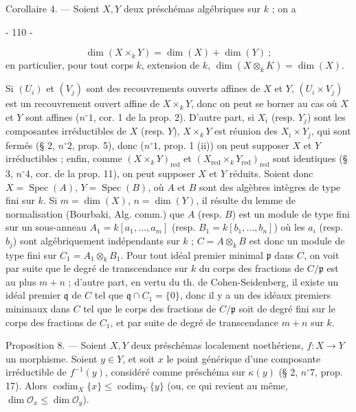 Corollaire 4. — Soient $X, Y$ deux préschémas algébriques sur $k$ ; on a

\newpage


- 110 -

$$\dim(X \times_k Y) = \dim(X) + \dim(Y) \ ;$$
en particulier, pour tout corps $k$, extension de $k$, $\dim(X \otimes_k K) = \dim(X)$.

Si $(U_i)$ et $(V_j)$ sont des recouvrements ouverts affines de $X$ et $Y$, $(U_i \times V_j)$ est un recouvrement ouvert affine de $X \times_k Y$, donc on peut se borner au cas où $X$ et $Y$ sont affines ($n^\circ 1$, cor. 1 de la prop. 2). D'autre part, si $X_i$ (resp. $Y_j$) sont les composantes irréductibles de $X$ (resp. $Y$), $X \times_k Y$ est réunion des $X_i \times Y_j$, qui sont fermés (§ 2, $n^\circ 2$, prop. 5), donc ($n^\circ 1$, prop. 1 (ii)) on peut supposer $X$ et $Y$ irréductibles ; enfin, comme $(X \times_k Y)_{\text{red}}$ et $(X_{\text{red}} \times_k Y_{\text{red}})_{\text{red}}$ sont identiques (§ 3, $n^\circ 4$, cor. de la prop. 11), on peut supposer $X$ et $Y$ réduits. Soient donc $X = \operatorname{Spec}(A)$, $Y = \operatorname{Spec}(B)$, où $A$ et $B$ sont des algèbres intègres de type fini sur $k$. Si $m = \dim(X)$, $n = \dim(Y)$, il résulte du lemme de normalisation (Bourbaki, Alg. comm.) que $A$ (resp. $B$) est un module de type fini sur un sous-anneau $A_1 = k[a_1, \dots, a_m]$ (resp. $B_1 = k[b_1, \dots, b_n]$) où les $a_i$ (resp. $b_j$) sont algébriquement indépendants sur $k$ ; $C = A \otimes_k B$ est donc un module de type fini sur $C_1 = A_1 \otimes_k B_1$. Pour tout idéal premier minimal $\mathfrak{p}$ dans $C$, on voit par suite que le degré de transcendance sur $k$ du corps des fractions de $C/\mathfrak{p}$ est au plus $m+n$ ; d'autre part, en vertu du th. de Cohen-Seidenberg, il existe un idéal premier $\mathfrak{q}$ de $C$ tel que $\mathfrak{q} \cap C_1 = \{0\}$, donc il y a un des idéaux premiers minimaux dans $C$ tel que le corps des fractions de $C/\mathfrak{p}$ soit de degré fini sur le corps des fractions de $C_1$, et par suite de degré de transcendance $m+n$ sur $k$.

Proposition 8. — Soient $X, Y$ deux préschémas localement noethériens, $f: X \to Y$ un morphisme. Soient $y \in Y$, et soit $x$ le point générique d'une composante irréductible de $f^{-1}(y)$, considéré comme préschéma sur $\kappa(y)$ (§ 2, $n^\circ 7$, prop. 17). Alors $\operatorname{codim}_X \{x\} \leqslant \operatorname{codim}_Y \{y\}$ (ou, ce qui revient au même, $\dim \mathcal{O}_x \leqslant \dim \mathcal{O}_y$).

